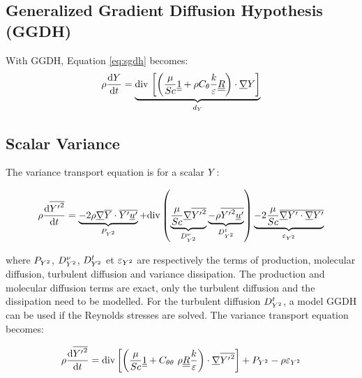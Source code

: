 \subsection{Generalized Gradient Diffusion Hypothesis (GGDH)}

With GGDH, Equation \eqref{eq:sgdh} becomes:
\begin{equation}
  \rho \dfrac{\mathrm{d} Y}{\mathrm{d} t}= \underbrace{\text{div}\, \left[\left( \dfrac{\mu}{Sc} \underline{\underline{1}} + \rho C_{\theta}\dfrac{k}{\varepsilon} \underline{\underline{R}}\right)\cdot \underline{\nabla}{Y} \right]}_{d_Y}
\label{eq:ggdh}
\end{equation}

\subsection{Scalar Variance}
The variance transport equation is for a scalar $Y$:

\begin{equation}
  \rho\frac{\mathrm{d} {\overline{{{Y}^\prime}^2}}}{\mathrm{d} t} =
  \underbrace{-2 \rho \underline{\nabla}{{\overline{Y}}} \cdot {\overline{{{Y}^\prime} {{\underline{u}}^\prime}}}
  }_{P_{Y^2} }
  + \text{div}\,{\left(\underbrace{ \dfrac{\mu}{Sc} \underline{\nabla}{{\overline{{{Y}^\prime}^2}}}}_{D^{\nu}_{Y^2 } } \underbrace{-\rho {\overline{{{Y}^\prime}^2 {{\underline{u}}^\prime} }}}_{D^{t}_{Y^2} }\right)}
  \underbrace{-2 \dfrac{\mu}{Sc} {\overline{\underline{\nabla}{{{Y}^\prime}}\cdot \underline{\nabla}{{{Y}^\prime}}}}}_{\varepsilon_{Y^2 } }
\end{equation}

where $P_{Y^2}$, $D^{\nu}_{Y^2}$, $D^{t}_{Y^2}$ et $\varepsilon_{Y^2}$ are respectively the terms of production, molecular diffusion, turbulent diffusion and variance dissipation.
The production and molecular diffusion terms are exact, only the turbulent diffusion and the dissipation need to be modelled.
For the turbulent diffusion $D^{t}_{Y^2 }$, a model GGDH can be used if the Reynolds stresses are solved.
The variance transport equation becomes:

\begin{equation}
  \rho \frac{\mathrm{d} {\overline{{{Y}^\prime}^2}}}{\mathrm{d} t} =\text{div}\,{ \left[ \left( \dfrac{\mu}{Sc} \underline{\underline{1}}  + C_{\theta \theta}~ \rho \underline{\underline{R}} \frac{k}{\varepsilon} \right)\cdot \underline{\nabla}{{\overline{{{Y}^\prime}^2}}} \right]} + P_{Y^2}- \rho \varepsilon_{Y^2}
 \label{eq:variance}
\end{equation}

